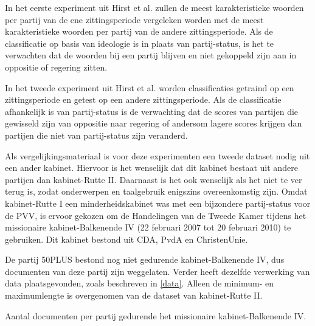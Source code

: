 In het eerste experiment uit Hirst et al. zullen de meest karakteristieke woorden per partij van de ene zittingsperiode vergeleken worden met de meest karakteristieke woorden per partij van de andere zittingsperiode. Als de classificatie op basis van ideologie is in plaats van partij-status, is het te verwachten dat de woorden bij een partij blijven en niet gekoppeld zijn aan in oppositie of regering zitten. \par
In het tweede experiment uit Hirst et al. worden classificaties getraind op een zittingsperiode en getest op een andere zittingsperiode. Als de classificatie afhankelijk is van partij-status is de verwachting dat de scores van partijen die gewisseld zijn van oppositie naar regering of andersom lagere scores krijgen dan partijen die niet van partij-status zijn veranderd.\par
Als vergelijkingsmateriaal is voor deze experimenten een tweede dataset nodig uit een ander kabinet. Hiervoor is het wenselijk dat dit kabinet bestaat uit andere partijen dan kabinet-Rutte II. Daarnaast is het ook wenselijk als het niet te ver terug is, zodat onderwerpen en taalgebruik enigszins overeenkomstig zijn. Omdat kabinet-Rutte I een minderheidskabinet was met een bijzondere partij-status voor de PVV, is ervoor gekozen om de Handelingen van de Tweede Kamer tijdens het missionaire kabinet-Balkenende IV (22 februari 2007 tot 20 februari 2010) te gebruiken. Dit kabinet bestond uit CDA, PvdA en ChristenUnie.\par
De partij 50PLUS bestond nog niet gedurende kabinet-Balkenende IV, dus documenten van deze partij zijn weggelaten. Verder heeft dezelfde verwerking van data plaatsgevonden, zoals beschreven in \ref{data}. Alleen de minimum- en maximumlengte is overgenomen van de dataset van kabinet-Rutte II.\par

\begin{table}[H]
\label{aantallenBal}
\caption{Aantal documenten per partij gedurende het missionaire kabinet-Balkenende IV.}
\centering

\end{table}

